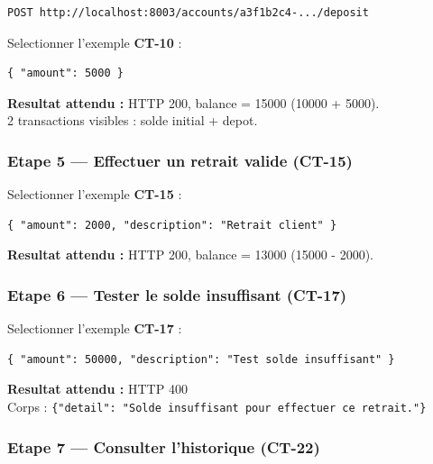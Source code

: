 \documentclass[12pt,a4paper]{article}
\begin{document}
\begin{lstlisting}[style=bash, caption={Requete POST /accounts/\{id\}/deposit}]
POST http://localhost:8003/accounts/a3f1b2c4-.../deposit
\end{lstlisting}

Selectionner l'exemple \textbf{CT-10} :
\begin{lstlisting}[style=json, caption={Corps}]
{ "amount": 5000 }
\end{lstlisting}

\begin{successbox}
\textbf{Resultat attendu :} HTTP 200, balance = 15000 (10000 + 5000).\\
2 transactions visibles : solde initial + depot.
\end{successbox}

\subsubsection{Etape 5 --- Effectuer un retrait valide (CT-15)}

Selectionner l'exemple \textbf{CT-15} :
\begin{lstlisting}[style=json, caption={Corps}]
{ "amount": 2000, "description": "Retrait client" }
\end{lstlisting}

\begin{successbox}
\textbf{Resultat attendu :} HTTP 200, balance = 13000 (15000 - 2000).
\end{successbox}

\subsubsection{Etape 6 --- Tester le solde insuffisant (CT-17)}

Selectionner l'exemple \textbf{CT-17} :
\begin{lstlisting}[style=json, caption={Corps}]
{ "amount": 50000, "description": "Test solde insuffisant" }
\end{lstlisting}

\begin{dangerbox}
\textbf{Resultat attendu :} HTTP 400\\
Corps : \texttt{\{"detail": "Solde insuffisant pour effectuer ce retrait."\}}
\end{dangerbox}

\subsubsection{Etape 7 --- Consulter l'historique (CT-22)}
\end{document}
